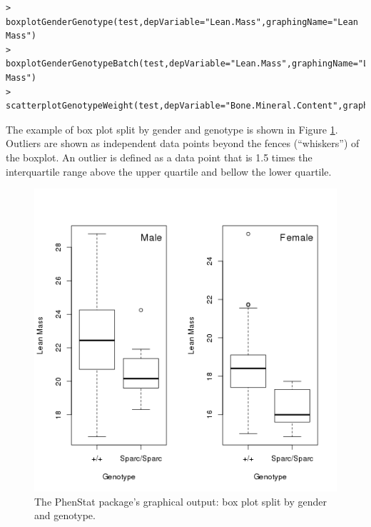 \documentclass[12pt,a4paper]{article}
\begin{document}
\begingroup
    \fontsize{8pt}{12pt}\selectfont
\begin{verbatim}
> boxplotGenderGenotype(test,depVariable="Lean.Mass",graphingName="Lean Mass")
> boxplotGenderGenotypeBatch(test,depVariable="Lean.Mass",graphingName="Lean Mass")
> scatterplotGenotypeWeight(test,depVariable="Bone.Mineral.Content",graphingName="BMC")
\end{verbatim}
\endgroup 

The example of box plot split by gender and genotype is shown in Figure \ref{fig:06}. Outliers are shown as independent data points beyond the fences (``whiskers'') of the boxplot. An outlier is defined as a data point that is 1.5 times the interquartile range above the upper quartile and bellow the lower quartile.
\begin{figure}[!htpb]%
\centerline{\includegraphics[scale=0.5]{boxplotGenderGenotype.png}}
\caption{The PhenStat package's graphical output: box plot split by gender and genotype.}\label{fig:06}
\end{figure}
\end{document}
